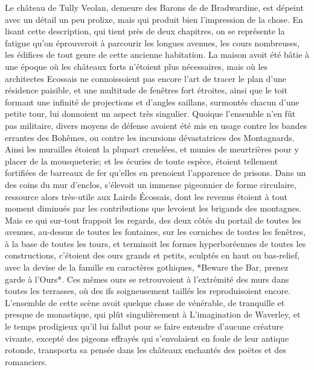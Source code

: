 Le château de Tully Veolan, demeure des Barons de de Bradwardine, est dépeint avec un détail un peu prolixe, mais qui produit bien l'impression de la chose. En lisant cette description, qui tient près de deux chapitres, on se représente la fatigue qu'on éprouveroit à parcourir les longues avenues, les cours nombreuses, les édifices de tout genre de cette ancienne habitation. La maison avoit été bâtie à une époque où les châteaux forts n'étoient plus nécessaires, mais où les architectes Ecossais ne connoissoient pas encore l'art de tracer le plan d'une résidence paisible, et une multitude de fenêtres fort étroites, ainsi que le toit formant une infinité de projections et d'angles saillans, surmontés chacun d'une petite tour, lui donnoient un aspect très singulier. Quoique l'ensemble n'en fût pas militaire, divers moyens de défense avoient été mis en usage\setcounter{page}{546} contre les bandes errantes des Bohêmes, ou contre les incursions dévastatrices des Montagnards. Ainsi les murailles étoient la plupart crenelées, et munies de meurtrières pour y placer de la mousqueterie; et les écuries de toute espèce, étoient tellement fortifiées de barreaux de fer qu'elles en prenoient l'apparence de prisons. Dans un des coins du mur d'enclos, s'élevoit un immense pigeonnier de forme circulaire, ressource alors très-utile aux Lairds Écossais, dont les revenus étoient à tout moment diminués par les contributions que levoient les brigands des montagnes. Mais ce qui sur-tout frappoit les regards, des deux côtés du portail de toutes les avenues, au-dessus de toutes les fontaines, sur les corniches de toutes les fenêtres, à la base de toutes les tours, et terminoit les formes hyperboréennes de toutes les constructions, c'étoient des ours grands et petits, sculptés en haut ou bas-relief, avec la devise de la famille en caractères gothiques, *Beware the Bar, prenez garde à l'Ours*. Ces mêmes ours se retrouvoient à l'extrémité des murs dans toutes les terrasses, où des ifs soigneusement taillés les reproduisoient encore. L'ensemble de cette scène avoit quelque chose de vénérable, de tranquille et presque de monastique, qui plût singulièrement à\setcounter{page}{547} L'imagination de Waverley, et le temps prodigieux qu'il lui fallut pour se faire entendre d'aucune créature vivante, excepté des pigeons effrayés qui s'envolaient en foule de leur antique rotonde, transporta sa pensée dans les châteaux enchantés des poëtes et des romanciers.
